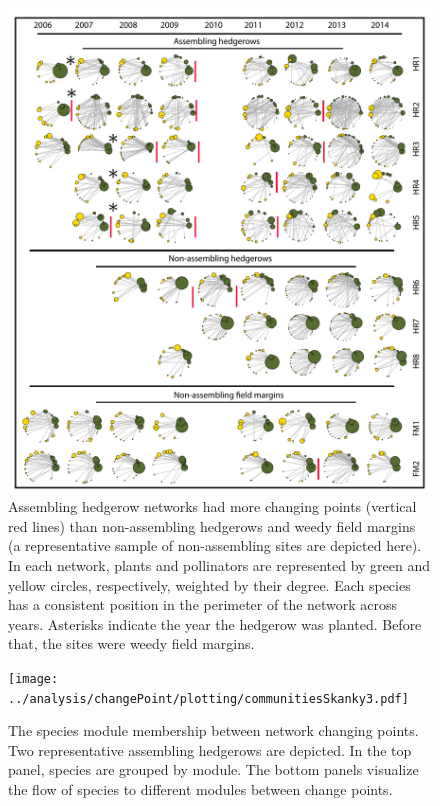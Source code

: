 \documentclass[12pt]{article}
\begin{document}
\begin{figure}
  \centering
  \includegraphics[width=1\textwidth]{../analysis/changePoint/plotting/networksv1.pdf}
  \caption{Assembling hedgerow networks had more changing points
    (vertical red lines) than non-assembling hedgerows and weedy field
    margins (a representative sample of non-assembling sites are
    depicted here). In each network, plants and pollinators are
    represented by green and yellow circles, respectively, weighted by
    their degree. Each species has a consistent position in the
    perimeter of the network across years. Asterisks indicate the year
    the hedgerow was planted. Before that, the sites were weedy field
    margins.}
  \label{fig:changePoints}
\end{figure}
\clearpage

\begin{figure}
  \centering
  \texttt{[image: ../analysis/changePoint/plotting/communitiesSkanky3.pdf]}
  \caption{The species module membership between network changing
    points. Two representative assembling hedgerows are depicted. In
    the top panel, species are grouped by module. The bottom panels
    visualize the flow of species to different modules between change
    points. }
  \label{fig:changePoints2}
\end{figure}
\clearpage
\end{document}
